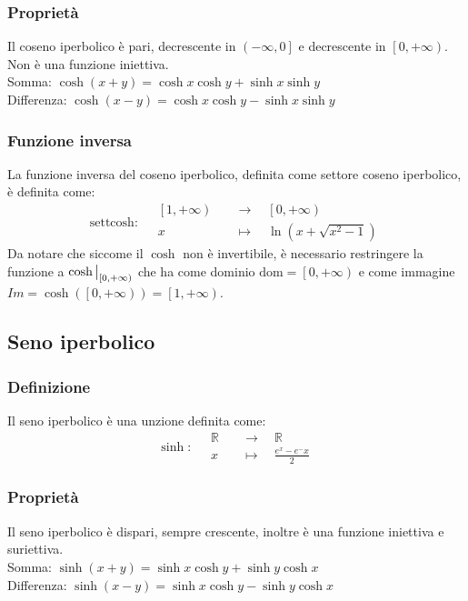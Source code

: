 \documentclass[a4paper]{article}
\newcommand\restr[2]{{%
	\left.\kern-\nulldelimiterspace %
	#1 %
	\vphantom{\big|} %
	\right|_{#2} %
	}}
\newcommand\dom{\text{dom}}
\newcommand\settcosh{\text{settcosh}}
\begin{document}
\subsubsection*{Proprietà}
Il coseno iperbolico è pari, decrescente in \(\left( - \infty, 0 \right]\) e decrescente in \(\left[ 0, + \infty \right)\). Non è una funzione iniettiva. \\
Somma: \(\cosh \left( x + y \right) = \cosh x \cosh y + \sinh x \sinh y\) \\
Differenza: \(\cosh \left( x - y \right) = \cosh x \cosh y - \sinh x \sinh y\)

\subsubsection*{Funzione inversa}
La funzione inversa del coseno iperbolico, definita come settore coseno iperbolico, è definita come:
\[\settcosh : \quad
\begin{aligned}
	\left[ 1, + \infty \right) \quad &\to \quad \left[ 0, + \infty \right) \\
	x \quad &\mapsto \quad \ln \left( x + \sqrt{ x^2 - 1 } \right)
\end{aligned}
\]
Da notare che siccome il \(\cosh\) non è invertibile, è necessario restringere la funzione a \(\restr{\cosh}{\left[ 0, + \infty \right)}\)
che ha come dominio \(\dom = \left[ 0, + \infty \right)\) e come immagine \(Im = \cosh \left( \left[ 0, + \infty \right) \right) = \left[ 1, + \infty \right)\).

\subsection{Seno iperbolico}
\subsubsection*{Definizione}
Il seno iperbolico è una unzione definita come:
\[\sinh : \quad
\begin{aligned}
	\mathbb{R} \quad &\to \quad \mathbb{R} \\
	x \quad &\mapsto \quad \frac{e^x - e^-x}{2}
\end{aligned}
\]

\subsubsection*{Proprietà}
Il seno iperbolico è dispari, sempre crescente, inoltre è una funzione iniettiva e suriettiva. \\
Somma: \(\sinh \left( x + y \right) = \sinh x \cosh y + \sinh y \cosh x\) \\
Differenza: \(\sinh \left( x - y \right) = \sinh x \cosh y - \sinh y \cosh x\)
\end{document}
